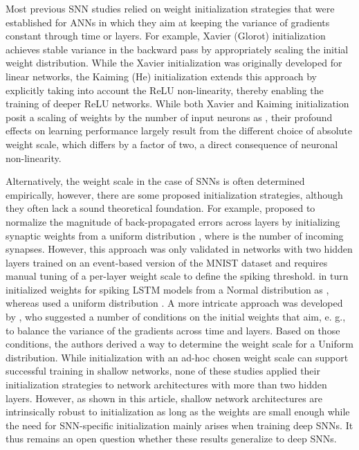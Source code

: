\documentclass[11pt,a4paper]{article}
\begin{document}
Most previous \ac{SNN} studies relied on weight initialization strategies that were established for \acp{ANN} in which they aim at keeping the variance of gradients constant through time or layers. 
For example, Xavier (Glorot) initialization \citep{Glorot2010-dj} achieves stable variance in the backward pass by appropriately scaling the initial weight distribution. 
While the Xavier initialization was originally developed for linear networks, the Kaiming (He) initialization \citep{He2015-kv} extends this approach by explicitly taking into account the \ac{ReLU} non-linearity, thereby enabling the training of deeper \ac{ReLU} networks. 
While both Xavier and Kaiming initialization posit a scaling of weights by the number of input neurons as , their profound effects on learning performance largely result from the different choice of absolute weight scale, which differs by a factor of two, a direct consequence of neuronal non-linearity.

Alternatively, the weight scale in the case of \acp{SNN} is often determined empirically, however, there are some proposed initialization strategies, although they often lack a sound theoretical foundation.
For example, \citet{Lee2016} proposed to normalize the magnitude of back-propagated errors across layers by initializing synaptic weights from a uniform distribution , where  is the number of incoming synapses.
However, this approach was only validated in networks with two hidden layers trained on an event-based version of the MNIST dataset \citep{Orchard2015-rl} and requires manual tuning of a per-layer weight scale to define the spiking threshold.
\citet{Bellec2018-yu} in turn initialized weights for spiking LSTM models from a Normal distribution as , whereas \citet{Zenke2021-zg} used a uniform distribution . 
A more intricate approach was developed by \citet{Herranz-Celotti2022}, who suggested a number of conditions on the initial weights that aim, e. g., to balance the variance of the gradients across time and layers. 
Based on those conditions, the authors derived a way to determine the weight scale for a Uniform distribution. 
While initialization with an ad-hoc chosen weight scale can support successful training in shallow networks, none of these studies applied their initialization strategies to network architectures with more than two hidden layers.
However, as shown in  this article, shallow network architectures are intrinsically robust to initialization as long as the weights are small enough while the need for \ac{SNN}-specific initialization mainly arises when training deep \acp{SNN}.
It thus remains an open question whether these results generalize to deep \acp{SNN}.
\end{document}
